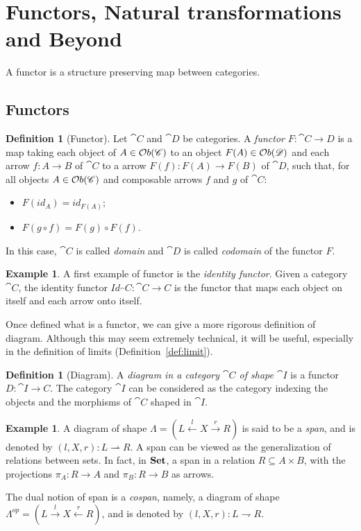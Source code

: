 \documentclass[a4paper, twoside,openright]{report}
\theoremstyle{plain}
\theoremstyle{definition}
\newtheorem{definition}[theorem]{Definition}
\newtheorem{example}[theorem]{Example}
\begin{document}
\section{Functors, Natural transformations and Beyond}

A functor is a structure preserving map between categories. 

\subsection{Functors}
\begin{definition}[Functor]
    Let $\cat{C}$ and $\cat{D}$ be categories. A \emph{functor} $F:\cat{C \rightarrow D}$ is a map taking each object of $A \in \mathcal{O}b(\mathscr{C})$ to an object $F(A) \in \mathcal{O}b(\mathscr{D})$ and each arrow $f:A\rightarrow B$ of $\cat C$ to a arrow $F(f): F(A) \rightarrow F(B)$ of $\cat D$, such that, for all objects $A \in \mathcal{O}b(\mathscr{C})$ and composable arrows $f$ and $g$ of $\cat C$:
    \begin{itemize}
        \item $F(id_{A}) = id_{F(A)}$;
        \item $F(g \circ f) = F(g) \circ F(f)$.
    \end{itemize}

    In this case, $\cat C$ is called \emph{domain} and $\cat D$ is called \emph{codomain} of the functor $F$.
\end{definition}

\begin{example}
    A first example of functor is the \emph{identity functor}. Given a category $\cat C$, the identity functor $Id_\cat C :\cat{C \rightarrow C}$ is the functor that maps each object on itself and each arrow onto itself. 
\end{example}

Once defined what is a functor, we can give a more rigorous definition of diagram. Although this may seem extremely technical, it will be useful, especially in the definition of limits (Definition~\ref{def:limit}).

\begin{definition}[Diagram]\label{def:diagram}
    A \emph{diagram in a category $\cat C$ of shape $\cat I$} is a functor $D: \cat{I \rightarrow C}$.
    The category $\cat I$ can be considered as the category indexing the objects and the morphisms of $\cat C$ shaped in $\cat I$.
\end{definition}

\begin{example}\label{ex: span}
    A diagram of shape $\Lambda = (L \xleftarrow{l} X \xrightarrow{r} R)$ is said to be a \emph{span}, and is denoted by $(l, X, r): L \rightharpoonup R$.
    A span can be viewed as the generalization of relations between sets. In fact, in $\mathbf{Set}$, a span in a relation $R \subseteq A \times B$, with the projections $\pi_A : R \rightarrow A$ and $\pi_B : R \rightarrow B$ as arrows.

    The dual notion of span is a \emph{cospan}, namely, a diagram of shape $\Lambda^{op} = (L \xrightarrow{l} X \xleftarrow{r} R)$, and is denoted by $(l, X, r): L \rightharpoondown R$.
\end{example}
\end{document}
